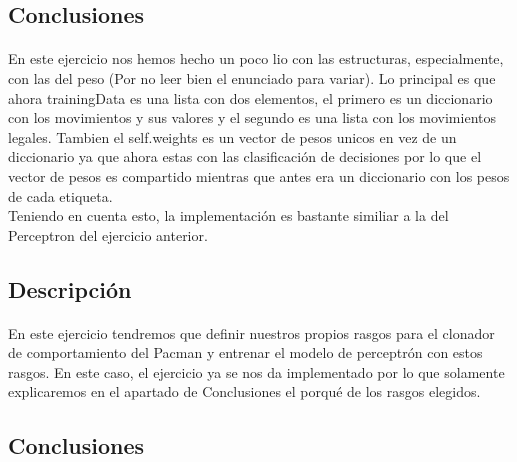 \documentclass{report}
\begin{document}
      \subsection*{Conclusiones}
        \paragraph*{}{
          En este ejercicio nos hemos hecho un poco lio con las estructuras, especialmente, con las del peso (Por no leer bien el enunciado para variar).
          Lo principal es que ahora trainingData es una lista con dos elementos, el primero es un diccionario con los movimientos y sus valores y el segundo es una lista con los movimientos legales.
          Tambien el self.weights es un vector de pesos unicos en vez de un diccionario ya que ahora estas con las clasificación de decisiones por lo que el vector de pesos es compartido mientras que antes era un diccionario con los pesos de cada etiqueta.\\

          Teniendo en cuenta esto, la implementación es bastante similiar a la del Perceptron del ejercicio anterior.
        }
      \subsection*{Descripción}
        \paragraph*{}{
          En este ejercicio tendremos que definir nuestros propios rasgos para el clonador de comportamiento del Pacman y entrenar el modelo de perceptrón con estos rasgos.
          En este caso, el ejercicio ya se nos da implementado por lo que solamente explicaremos en el apartado de Conclusiones el porqué de los rasgos elegidos.
        }
      \subsection*{Conclusiones}
\end{document}
